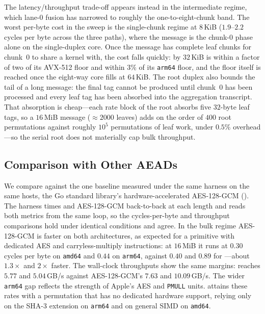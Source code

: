 The latency/throughput trade-off appears instead in the intermediate regime,
which lane-$0$ fusion has narrowed to roughly the one-to-eight-chunk band. The
worst per-byte cost in the sweep is the single-chunk regime at $8$\,KiB
($1.9$--$2.2$ cycles per byte across the three paths), where the message is the
chunk-$0$ phase alone on the single-duplex core. Once the message has complete
leaf chunks for chunk~$0$ to share a kernel with, the cost falls quickly: by
$32$\,KiB \TW{} is within a factor of two of its AVX-512 floor and within $3\%$
of its \texttt{arm64} floor, and the floor itself is reached once the eight-way
core fills at $64$\,KiB. The root duplex also bounds the tail of a long
message: the final tag cannot be produced until chunk~$0$ has been processed and
every leaf tag has been absorbed into the aggregation transcript. That absorption
is cheap---each rate block of the root absorbs five $32$-byte leaf tags, so a
$16$\,MiB message ($\approx 2000$ leaves) adds on the order of $400$ root
permutations against roughly $10^5$ permutations of leaf work, under $0.5\%$
overhead---so the serial root does not materially cap bulk throughput.

\subsection{Comparison with Other AEADs}
\label{sec:compare-perf}

We compare against the one baseline measured under the same harness on the same
hosts, the Go standard library's hardware-accelerated AES-128-GCM
(). The harness times \TW{} and AES-128-GCM
back-to-back at each length and reads both metrics from the same loop, so the
cycles-per-byte and throughput comparisons hold under identical conditions and
agree. In the bulk regime AES-128-GCM is faster on both architectures, as
expected for a primitive with dedicated AES and carryless-multiply instructions:
at $16$\,MiB it runs at $0.30$ cycles per byte on \texttt{amd64} and $0.44$ on
\texttt{arm64}, against $0.40$ and $0.89$ for \TW{}---about $1.3\times$ and
$2\times$ faster. The wall-clock throughputs show the same margins: \TW{} reaches
$5.77$ and $5.04$\,GB/s against AES-128-GCM's $7.63$ and $10.09$\,GB/s. The wider
\texttt{arm64} gap reflects the strength of Apple's AES and \texttt{PMULL} units.
\TW{} attains these rates with a permutation that has no dedicated hardware
support, relying only on the SHA-3 extension on \texttt{arm64} and on general SIMD
on \texttt{amd64}.

